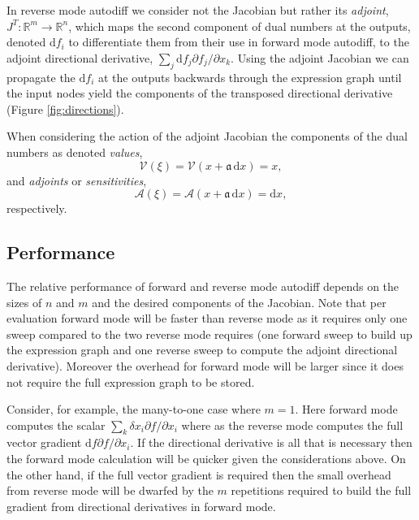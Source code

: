 In reverse mode autodiff we consider not the Jacobian but rather its \textit{adjoint},
$J^{T} : \mathbb{R}^{m} \rightarrow \mathbb{R}^{n}$, which maps the second
component of dual numbers at the outputs, denoted $\mathrm{d} f_{i}$ to differentiate
them from their use in forward mode autodiff, to the adjoint directional derivative, 
$\sum_{j} \mathrm{d} f_{j} \partial f_{j} / \partial x_{k}$.  Using the adjoint Jacobian
we can propagate the $\mathrm{d} f_{i}$ at the outputs backwards through the 
expression graph until the input nodes yield the components of the transposed
directional derivative (Figure \ref{fig:directions}).

When considering the action of the adjoint Jacobian the components of the dual
numbers as denoted \textit{values},
%
\begin{equation*}
\mathcal{V} \! \left( \xi \right) 
= \mathcal{V} \! \left( x + \mathfrak{a} \, \mathrm{d} x \right) 
= x,
\end{equation*}
%
and \textit{adjoints} or \textit{sensitivities},
\begin{equation*}
\mathcal{A} \! \left( \xi \right) 
= \mathcal{A} \! \left( x + \mathfrak{a} \, \mathrm{d} x \right) 
= \mathrm{d} x,
\end{equation*}
%
respectively.

\subsection*{Performance}

The relative performance of forward and reverse mode autodiff depends on
the sizes of $n$ and $m$ and the desired components of the Jacobian.  Note
that per evaluation forward mode will be faster than reverse mode as it requires
only one sweep compared to the two reverse mode requires (one forward sweep
to build up the expression graph and one reverse sweep to compute the adjoint
directional derivative).  Moreover the overhead for forward mode will be larger
since it does not require the full expression graph to be stored.

Consider, for example, the many-to-one case where $m = 1$.  Here forward
mode computes the scalar $\sum_{k} \delta x_{i} \partial f / \partial x_{i}$
where as the reverse mode computes the full vector gradient 
$\mathrm{d} f \partial f / \partial x_{i}$.  If the directional derivative is all
that is necessary then the forward mode calculation will be quicker given
the considerations above.  On the other hand, if the full vector gradient is required 
then the small overhead from reverse mode will be dwarfed by the $m$ repetitions 
required to build the full gradient from directional derivatives in forward mode.

